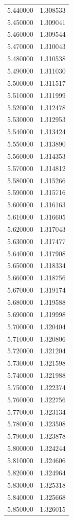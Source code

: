\begin{tabular}{rr}
5.440000 & 1.308533 \\
5.450000 & 1.309041 \\
5.460000 & 1.309544 \\
5.470000 & 1.310043 \\
5.480000 & 1.310538 \\
5.490000 & 1.311030 \\
5.500000 & 1.311517 \\
5.510000 & 1.311999 \\
5.520000 & 1.312478 \\
5.530000 & 1.312953 \\
5.540000 & 1.313424 \\
5.550000 & 1.313890 \\
5.560000 & 1.314353 \\
5.570000 & 1.314812 \\
5.580000 & 1.315266 \\
5.590000 & 1.315716 \\
5.600000 & 1.316163 \\
5.610000 & 1.316605 \\
5.620000 & 1.317043 \\
5.630000 & 1.317477 \\
5.640000 & 1.317908 \\
5.650000 & 1.318334 \\
5.660000 & 1.318756 \\
5.670000 & 1.319174 \\
5.680000 & 1.319588 \\
5.690000 & 1.319998 \\
5.700000 & 1.320404 \\
5.710000 & 1.320806 \\
5.720000 & 1.321204 \\
5.730000 & 1.321598 \\
5.740000 & 1.321988 \\
5.750000 & 1.322374 \\
5.760000 & 1.322756 \\
5.770000 & 1.323134 \\
5.780000 & 1.323508 \\
5.790000 & 1.323878 \\
5.800000 & 1.324244 \\
5.810000 & 1.324606 \\
5.820000 & 1.324964 \\
5.830000 & 1.325318 \\
5.840000 & 1.325668 \\
5.850000 & 1.326015 \\

\end{tabular}
